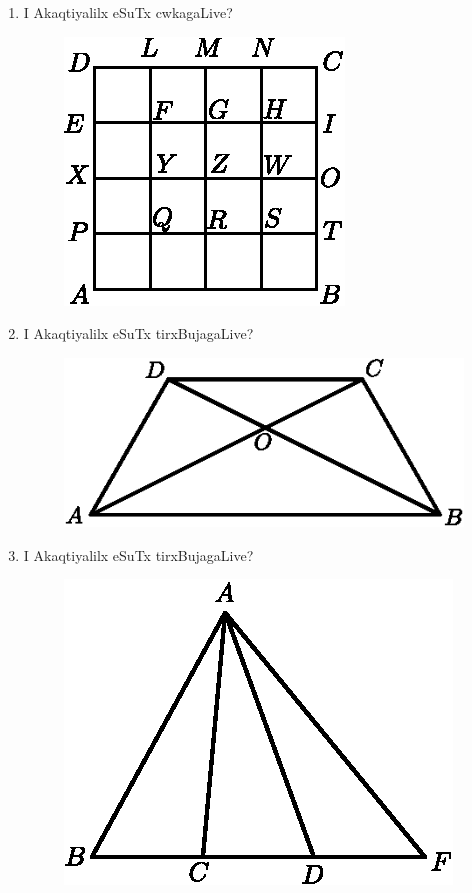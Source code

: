 \begin{enumerate}
\item I Akaqtiyalilx eSuTx cwkagaLive?
\begin{figure}[H]
\centering
\includegraphics{src/figures/exr4.eps}
\end{figure}

\item I Akaqtiyalilx eSuTx tirxBujagaLive?
\begin{figure}[H]
\centering
\includegraphics{src/figures/exr5.eps}
\end{figure}


\item I Akaqtiyalilx eSuTx tirxBujagaLive?
\begin{figure}[H]
\centering
\includegraphics{src/figures/exr6.eps}
\end{figure}


\end{enumerate}
